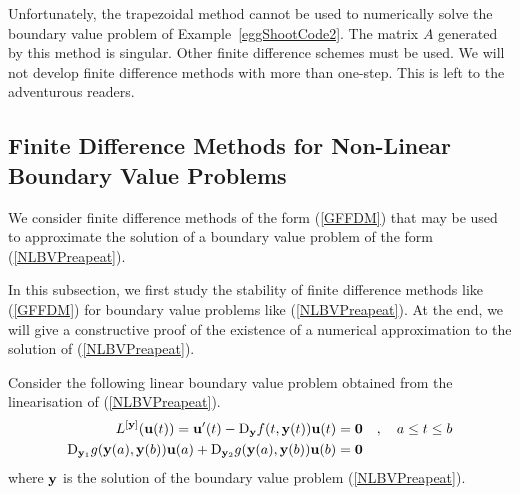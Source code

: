 Unfortunately, the trapezoidal method cannot be used to numerically
solve the boundary value problem of Example~\ref{eggShootCode2}.  The
matrix $A$ generated by this method is singular.  Other finite
difference schemes must be used.  We will not develop finite difference
methods with more than one-step.  This is left to the adventurous
readers.

\subsection{Finite Difference Methods for Non-Linear Boundary Value
Problems}

We consider finite difference methods of the form (\ref{GFFDM}) that
may be used to approximate the solution of a boundary value problem of
the form (\ref{NLBVPreapeat}).

In this subsection, we first study the stability of finite difference
methods like (\ref{GFFDM}) for boundary value problems like
(\ref{NLBVPreapeat}).  At the end, we will give a constructive proof
of the existence of a numerical approximation to the solution of
(\ref{NLBVPreapeat}).

Consider the following linear boundary value problem obtained from the
linearisation of (\ref{NLBVPreapeat}).
\begin{equation} \label{LinGBVP}
\begin{split}
L^{[\mathbf{y}]}(\mathbf{u}(t)) = \mathbf{u}'(t) -
\mathrm{D}_{\mathbf{y}}f(t,\mathbf{y}(t)) \mathbf{u}(t) &= \mathbf{0} \quad , \quad
a \leq t \leq b  \\
\mathrm{D}_{\mathbf{y}_1} g(\mathbf{y}(a),\mathbf{y}(b)) \mathbf{u}(a) +
\mathrm{D}_{\mathbf{y}_2} g(\mathbf{y}(a),\mathbf{y}(b)) \mathbf{u}(b) &= \mathbf{0}
\end{split}
\end{equation}
where $\mathbf{y}$ is the solution of the boundary value problem
(\ref{NLBVPreapeat}).

